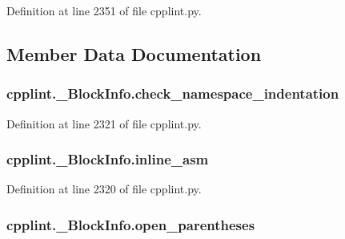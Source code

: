 Definition at line 2351 of file cpplint.\+py.



\subsection{Member Data Documentation}
\subsubsection[{\texorpdfstring{check\+\_\+namespace\+\_\+indentation}{check_namespace_indentation}}]{\setlength{\rightskip}{0pt plus 5cm}cpplint.\+\_\+\+Block\+Info.\+check\+\_\+namespace\+\_\+indentation}\hypertarget{classcpplint_1_1___block_info_a120822b07db37b3480a573ec29ee4457}{}\label{classcpplint_1_1___block_info_a120822b07db37b3480a573ec29ee4457}


Definition at line 2321 of file cpplint.\+py.

\subsubsection[{\texorpdfstring{inline\+\_\+asm}{inline_asm}}]{\setlength{\rightskip}{0pt plus 5cm}cpplint.\+\_\+\+Block\+Info.\+inline\+\_\+asm}\hypertarget{classcpplint_1_1___block_info_aad762ef7088f2f556a75c9a80006f4db}{}\label{classcpplint_1_1___block_info_aad762ef7088f2f556a75c9a80006f4db}


Definition at line 2320 of file cpplint.\+py.

\subsubsection[{\texorpdfstring{open\+\_\+parentheses}{open_parentheses}}]{\setlength{\rightskip}{0pt plus 5cm}cpplint.\+\_\+\+Block\+Info.\+open\+\_\+parentheses}\hypertarget{classcpplint_1_1___block_info_a02a0b48995a599f6b2bbaa6f16cca98a}{}\label{classcpplint_1_1___block_info_a02a0b48995a599f6b2bbaa6f16cca98a}



